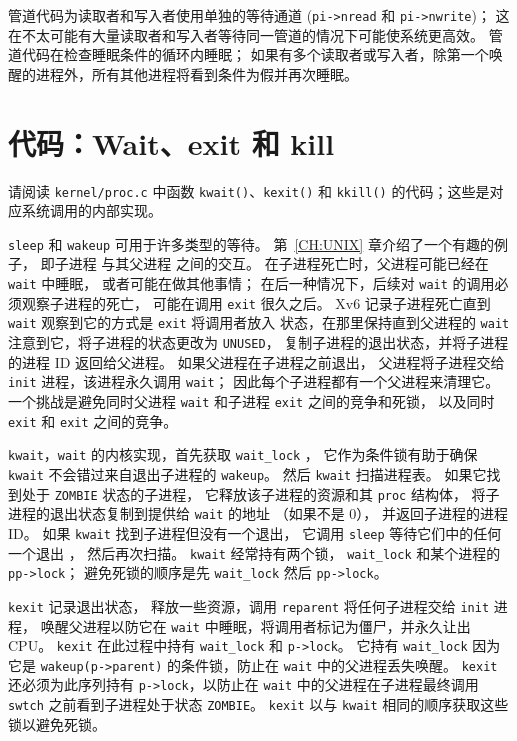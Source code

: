 管道代码为读取者和写入者使用单独的等待通道
(\lstinline{pi->nread}
和
\lstinline{pi->nwrite})；
这在不太可能有大量读取者和写入者等待同一管道的情况下可能使系统更高效。
管道代码在检查睡眠条件的循环内睡眠；
如果有多个读取者或写入者，除第一个唤醒的进程外，所有其他进程将看到条件为假并再次睡眠。
\section{代码：Wait、exit 和 kill}

请阅读 {\tt kernel/proc.c} 中函数 {\tt kwait()}、{\tt kexit()}
和 {\tt kkill()} 的代码；这些是对应系统调用的内部实现。

\lstinline{sleep}
和
\lstinline{wakeup}
可用于许多类型的等待。
第~\ref{CH:UNIX} 章介绍了一个有趣的例子，
即子进程 
与其父进程  之间的交互。
在子进程死亡时，父进程可能已经在 {\tt wait} 中睡眠，
或者可能在做其他事情；
在后一种情况下，后续对 {\tt wait} 的调用必须观察子进程的死亡，
可能在调用 {\tt exit} 很久之后。
Xv6 记录子进程死亡直到 {\tt wait} 观察到它的方式是 {\tt exit} 将调用者放入 
状态，在那里保持直到父进程的 {\tt wait} 注意到它，将子进程的状态更改为 {\tt UNUSED}，
复制子进程的退出状态，并将子进程的进程 ID 返回给父进程。
如果父进程在子进程之前退出，
父进程将子进程交给
\lstinline{init}
进程，该进程永久调用 {\tt wait}；
因此每个子进程都有一个父进程来清理它。
一个挑战是避免同时父进程
\lstinline{wait}
和子进程
\lstinline{exit}
之间的竞争和死锁，
以及同时
\lstinline{exit} 和 \lstinline{exit} 之间的竞争。

\lstinline{kwait}，{\tt wait} 的内核实现，首先获取
\lstinline{wait_lock}
，
它作为条件锁有助于确保 \lstinline{kwait} 不会错过来自退出子进程的 \lstinline{wakeup}。
然后 \lstinline{kwait} 扫描进程表。
如果它找到处于 \texttt{ZOMBIE} 状态的子进程，
它释放该子进程的资源和其 \lstinline{proc} 结构体，
将子进程的退出状态复制到提供给 \lstinline{wait} 的地址
（如果不是 0），
并返回子进程的进程 ID。
如果
\lstinline{kwait}
找到子进程但没有一个退出，
它调用
\lstinline{sleep}
等待它们中的任何一个退出
，
然后再次扫描。
\lstinline{kwait} 经常持有两个锁，
\lstinline{wait_lock} 和某个进程的 \lstinline{pp->lock}；
避免死锁的顺序是先 \lstinline{wait_lock} 然后 \lstinline{pp->lock}。

\lstinline{kexit}  记录退出状态，
释放一些资源，调用 \lstinline{reparent} 将任何子进程交给 \lstinline{init} 进程，
唤醒父进程以防它在 \lstinline{wait} 中睡眠，将调用者标记为僵尸，并永久让出 CPU。
\lstinline{kexit} 在此过程中持有
\lstinline{wait_lock} 和 \lstinline{p->lock}。
它持有 \lstinline{wait_lock} 因为它是
\lstinline{wakeup(p->parent)} 的条件锁，防止在 \lstinline{wait} 中的父进程丢失唤醒。
\lstinline{kexit} 还必须为此序列持有
\lstinline{p->lock}，以防止在 \lstinline{wait} 中的父进程在子进程最终调用
\lstinline{swtch} 之前看到子进程处于状态
\lstinline{ZOMBIE}。
\lstinline{kexit} 以与 \lstinline{kwait} 相同的顺序获取这些锁以避免死锁。

